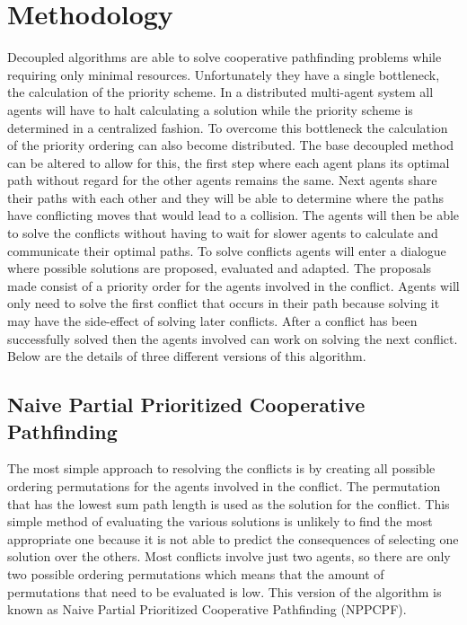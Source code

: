 \section{Methodology}\label{sec:method}
Decoupled algorithms are able to solve cooperative pathfinding problems while
requiring only minimal resources. Unfortunately they have a single bottleneck,
the calculation of the priority scheme. In a distributed multi-agent system all
agents will have to halt calculating a solution while the priority scheme is
determined in a centralized fashion. To overcome this bottleneck the
calculation of the
priority ordering can also become distributed. The base decoupled method can be
altered to allow for this, the first step where each agent plans its optimal
path without regard for the other agents remains the same. Next agents share
their paths with each other and they will be able to determine where the paths
have conflicting moves that would lead to a collision. The agents will then be
able to solve the conflicts without having to wait for slower agents to
calculate and communicate their optimal paths. To solve conflicts agents will
enter a dialogue where possible solutions are proposed, evaluated and adapted.
The proposals made consist of a priority order for the agents involved in the
conflict. Agents will only need to solve the first conflict that occurs in
their path because solving it may have the side-effect of solving later
conflicts. After a conflict has been successfully solved then the agents
involved can work on solving the next conflict.
Below are the details of three different versions of this algorithm.

\subsection{Naive Partial Prioritized Cooperative Pathfinding}
The most simple approach to resolving the conflicts is by creating all possible
ordering permutations for the agents involved in the conflict. The permutation
that has the lowest sum path length is used as the solution for the conflict.
This simple method of evaluating the various solutions is unlikely to find the
most appropriate one because it is not able to predict the consequences of
selecting one solution over the others.
Most conflicts involve just two agents, so there are only two possible ordering
permutations which means that the amount of permutations that need to be
evaluated is low. This version of the algorithm is known as Naive Partial
Prioritized  Cooperative Pathfinding (NPPCPF).

